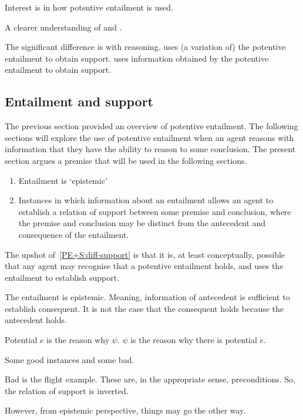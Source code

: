 \begin{note}[Overview]
  Interest is in how potentive entailment is used.

  A clearer understanding of \AR{} and \WR{}.

  The significant difference is with reasoning.
  \AR{} uses (a variation of) the potentive entailment to obtain support.
  \WR{} uses information obtained by the potentive entailment to obtain support.
\end{note}

\subsection{Entailment and support}
\label{sec:entailment-support}

\begin{note}[Overview]
  The previous section provided an overview of potentive entailment.
  The following sections will explore the use of potentive entailment when an agent reasons with information that they have the ability to reason to some conclusion.
  The present section argues a premise that will be used in the following sections.

  \begin{enumerate}
  \item\label{PE+S:epistemic} Entailment is `epistemic'
  \item\label{PE+S:diff-support} Instances in which information about an entailment allows an agent to establish a relation of support between some premise and conclusion, where the premise and conclusion may be distinct from the antecedent and consequence of the entailment.
  \end{enumerate}
  The upshot of~\ref{PE+S:diff-support} is that it is, at least conceptually, possible that any agent may recognise that a potentive entailment holds, and uses the entailment to establish support.
\end{note}

\begin{note}[Epistemic]
  The entailment is epistemic.
  Meaning, information of antecedent is sufficient to establish consequent.
  It is not the case that the consequent holds because the antecedent holds.
\end{note}



\begin{note}
  Potential \(e\) is the reason why \(\psi\).
  \(\psi\) is the reason why there is potential \(e\).

  Some good instances and some bad.

  Bad is the flight example.
  These are, in the appropriate sense, preconditions.
  So, the relation of support is inverted.

  However, from epistemic perspective, things may go the other way.
\end{note}

